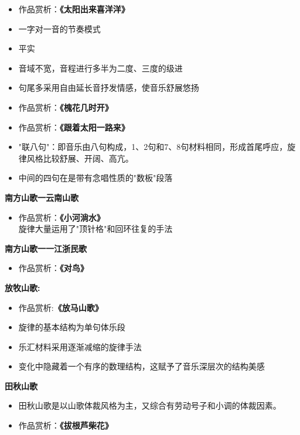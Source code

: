 \documentclass[
]{article}
\providecommand{\tightlist}{%
  \setlength{\itemsep}{0pt}\setlength{\parskip}{0pt}}
\begin{document}
\begin{itemize}
\item
  作品赏析：\textbf{《太阳出来喜洋洋》}
\item
  一字对一音的节奏模式
\item
  平实
\item
  音域不宽，音程进行多半为二度、三度的级进
\item
  句尾多采用自由延长音抒发情感，使音乐舒展悠扬
\item
  作品赏析：\textbf{《槐花几时开》}
\item
  作品赏析：\textbf{《跟着太阳一路来》}
\item
  "联八句"：即音乐由八句构成，1、2句和7、8句材料相同，形成首尾呼应，旋律风格比较舒展、开阔、高亢。
\item
  中间的四句在是带有念唱性质的"数板"段落
\end{itemize}

\textbf{南方山歌一云南山歌}

\begin{itemize}
\tightlist
\item
  作品赏析：\textbf{《小河淌水》}\\
  旋律大量运用了"顶针格"和回环往复的手法
\end{itemize}

\textbf{南方山歌一一江浙民歌}

\begin{itemize}
\tightlist
\item
  作品赏析：\textbf{《对鸟》}
\end{itemize}

\textbf{放牧山歌:}

\begin{itemize}
\tightlist
\item
  作品赏析:\textbf{《放马山歌》}
\item
  旋律的基本结构为单句体乐段
\item
  乐汇材料采用逐渐减缩的旋律手法
\item
  变化中隐藏着一个有序的数理结构，这赋予了音乐深层次的结构美感
\end{itemize}

\textbf{田秋山歌}

\begin{itemize}
\tightlist
\item
  田秋山歌是以山歌体裁风格为主，又综合有劳动号子和小调的体裁因素。
\item
  作品赏析：\textbf{《拔根芦柴花》}
\end{itemize}
\end{document}
